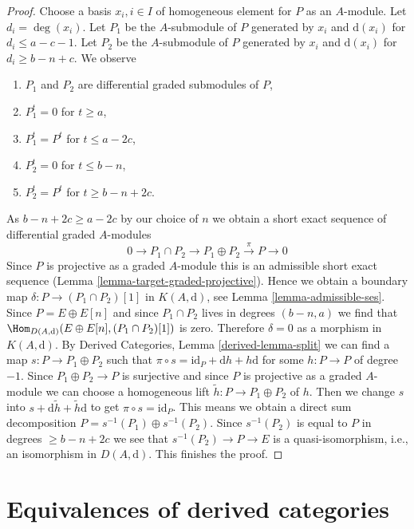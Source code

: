 \begin{proof}
\medskip\noindent
Choose a basis $x_i, i \in I$ of homogeneous element for $P$ as an
$A$-module. Let $d_i = \deg(x_i)$.
Let $P_1$ be the $A$-submodule of $P$ generated by $x_i$ and
$\text{d}(x_i)$ for $d_i \leq a - c - 1$.
Let $P_2$ be the $A$-submodule of $P$ generated by $x_i$ and
$\text{d}(x_i)$ for $d_i \geq b - n + c$.
We observe
\begin{enumerate}
\item $P_1$ and $P_2$ are differential graded submodules of $P$,
\item $P_1^t = 0$ for $t \geq a$,
\item $P_1^t = P^t$ for $t \leq a - 2c$,
\item $P_2^t = 0$ for $t \leq b - n$,
\item $P_2^t = P^t$ for $t \geq b - n + 2c$.
\end{enumerate}
As $b - n + 2c \geq a - 2c$ by our choice of $n$
we obtain a short exact sequence of differential graded $A$-modules
$$
0 \to P_1 \cap P_2 \to P_1 \oplus P_2 \xrightarrow{\pi} P \to 0
$$
Since $P$ is projective as a graded $A$-module this is an admissible
short exact sequence (Lemma \ref{lemma-target-graded-projective}).
Hence we obtain a boundary map
$\delta : P \to (P_1 \cap P_2)[1]$ in $K(A, \text{d})$, see
Lemma \ref{lemma-admissible-ses}.
Since $P = E \oplus E[n]$ and since $P_1 \cap P_2$ lives in
degrees $(b - n, a)$ we find that
$\Hom_{D(A, \text{d})}(E \oplus E[n], (P_1 \cap P_2)[1])$ is
zero. Therefore $\delta = 0$ as a morphism in $K(A, \text{d})$.
By Derived Categories, Lemma \ref{derived-lemma-split}
we can find a map $s : P \to P_1 \oplus P_2$ such that
$\pi \circ s = \text{id}_P + \text{d}h + h\text{d}$ for some $h : P \to P$
of degree $-1$. Since $P_1 \oplus P_2 \to P$ is surjective and since $P$
is projective as a graded $A$-module we can choose a homogeneous
lift $\tilde h : P \to P_1 \oplus P_2$ of $h$. Then we change
$s$ into $s + \text{d} \tilde h + \tilde h \text{d}$ to get
$\pi \circ s = \text{id}_P$. This means we obtain a direct
sum decomposition $P = s^{-1}(P_1) \oplus s^{-1}(P_2)$.
Since $s^{-1}(P_2)$ is equal to $P$ in degrees $\geq b - n + 2c$
we see that $s^{-1}(P_2) \to P \to E$ is a quasi-isomorphism,
i.e., an isomorphism in $D(A, \text{d})$. This finishes the proof.
\end{proof}








\section{Equivalences of derived categories}
\label{section-equivalence}

